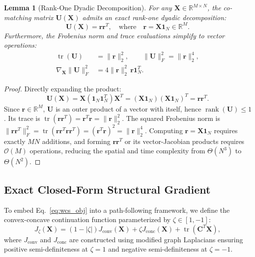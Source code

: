 \documentclass[a4paper,fleqn]{cas-dc}
\theoremstyle{thmstyleone}
\newtheorem{lemma}[theorem]{Lemma}
\theoremstyle{thmstyletwo}
\theoremstyle{thmstylethree}
\begin{document}
\begin{lemma}[Rank-One Dyadic Decomposition]
\label{lem:rank1}
For any $\mathbf{X} \in \mathbb{R}^{M \times N}$, the co-matching matrix $\mathbf{U}(\mathbf{X})$ admits an exact rank-one dyadic decomposition:
\begin{equation}
\mathbf{U}(\mathbf{X}) = \mathbf{r}\mathbf{r}^T, \quad \text{where} \quad \mathbf{r} = \mathbf{X}\mathbf{1}_N \in \mathbb{R}^M.
\label{eq:rank1}
\end{equation}
Furthermore, the Frobenius norm and trace evaluations simplify to vector operations:
\begin{align}
\operatorname{tr}(\mathbf{U}) &= \|\mathbf{r}\|_2^2, \qquad \|\mathbf{U}\|_F^2 = \|\mathbf{r}\|_2^4, \nonumber \\
\nabla_{\mathbf{X}} \|\mathbf{U}\|_F^2 &= 4 \|\mathbf{r}\|_2^2 \, \mathbf{r}\mathbf{1}_N^T.
\label{eq:rank1_props}
\end{align}
\end{lemma}
\begin{proof}
Directly expanding the product:
\begin{equation}
\mathbf{U}(\mathbf{X}) = \mathbf{X}(\mathbf{1}_N\mathbf{1}_N^T)\mathbf{X}^T = (\mathbf{X}\mathbf{1}_N)(\mathbf{X}\mathbf{1}_N)^T = \mathbf{r}\mathbf{r}^T.
\end{equation}
Since $\mathbf{r} \in \mathbb{R}^M$, $\mathbf{U}$ is an outer product of a vector with itself, hence $\operatorname{rank}(\mathbf{U}) \le 1$. Its trace is $\operatorname{tr}(\mathbf{r}\mathbf{r}^T) = \mathbf{r}^T\mathbf{r} = \|\mathbf{r}\|_2^2$. The squared Frobenius norm is $\|\mathbf{r}\mathbf{r}^T\|_F^2 = \operatorname{tr}(\mathbf{r}\mathbf{r}^T\mathbf{r}\mathbf{r}^T) = (\mathbf{r}^T\mathbf{r})^2 = \|\mathbf{r}\|_2^4$. Computing $\mathbf{r} = \mathbf{X}\mathbf{1}_N$ requires exactly $M N$ additions, and forming $\mathbf{r}\mathbf{r}^T$ or its vector-Jacobian products requires $\mathcal{O}(M)$ operations, reducing the spatial and time complexity from $\Theta(N^3)$ to $\Theta(N^2)$.
\end{proof}

\subsection{Exact Closed-Form Structural Gradient}
To embed Eq.~\eqref{eq:wcs_obj} into a path-following framework, we define the convex-concave continuation function parameterized by $\zeta \in [1, -1]$:
\begin{equation}
J_\zeta(\mathbf{X}) = (1 - |\zeta|) J_{\text{conv}}(\mathbf{X}) + \zeta J_{\text{conc}}(\mathbf{X}) + \operatorname{tr}(\mathbf{C}^T\mathbf{X}),
\label{eq:homotopy}
\end{equation}
where $J_{\text{conv}}$ and $J_{\text{conc}}$ are constructed using modified graph Laplacians ensuring positive semi-definiteness at $\zeta = 1$ and negative semi-definiteness at $\zeta = -1$.
\end{document}
